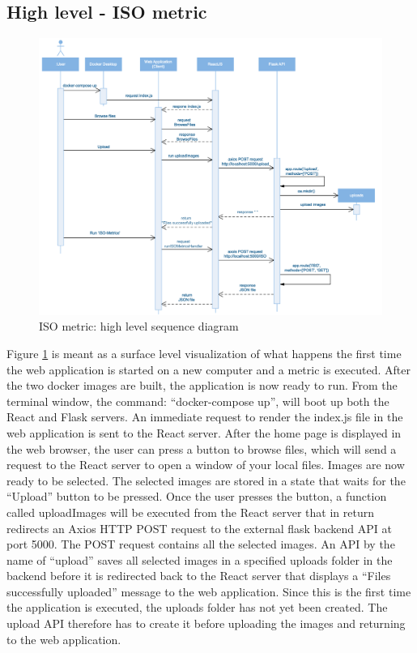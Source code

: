 \subsection{High level - ISO metric}

\begin{figure}[h]
    \centering
    \includegraphics[scale = 0.52]{figures/HighLevel.png}
    \caption{ISO metric: high level sequence diagram}
    \label{fig:highlevel}
\end{figure}
\newpage
Figure \ref{fig:highlevel} is meant as a surface level visualization of what happens the first time the web application is started on a new computer and a metric is executed. After the two docker images are built, the application is now ready to run. From the terminal window, the command: ``docker-compose up'', will boot up both the React and Flask servers. An immediate request to render the index.js file in the web application is sent to the React server. After the home page is displayed in the web browser, the user can press a button to browse files, which will send a request to the React server to open a window of your local files. Images are now ready to be selected. The selected images are stored in a state that waits for the ``Upload'' button to be pressed. Once the user presses the button, a function called uploadImages will be executed from the React server that in return redirects an Axios HTTP POST request to the external flask backend API at port 5000. The POST request contains all the selected images. An API by the name of ``upload'' saves all selected images in a specified uploads folder in the backend before it is redirected back to the React server that displays a ``Files successfully uploaded'' message to the web application. Since this is the first time the application is executed, the uploads folder has not yet been created. The upload API therefore has to create it before uploading the images and returning to the web application. 

